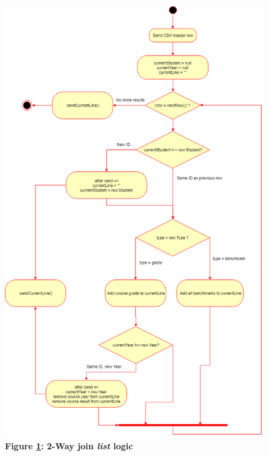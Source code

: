 \begin{figure}[H]
    \centering
    \begin{mdframed}
        \centering
        \includegraphics[scale=0.5]{./resources/figures/2-way-join-list.png}
    \end{mdframed}
    \caption[2-Way Join List Function]{\textbf{Figure \ref{fig-2-way-join-list-function}: 2-Way join \textit{list} logic}}
    \label{fig-2-way-join-list-function}
\end{figure}
